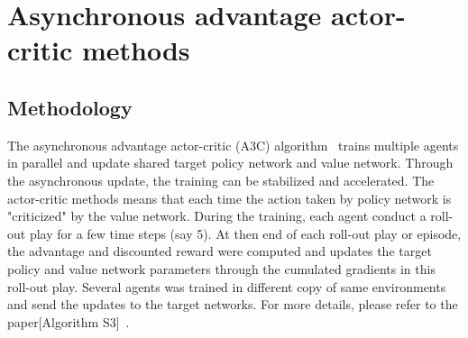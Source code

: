 
\section{Asynchronous advantage actor-critic methods}
\subsection{Methodology}

The asynchronous advantage actor-critic (A3C) algorithm~\cite{mnih2016asynchronous}
 trains multiple agents in parallel and update shared
target policy network and value network. 
Through the asynchronous update, the training can be stabilized 
and accelerated. The actor-critic methods means that each time
the action taken by policy network is "criticized"
by the value network. During the training, each agent conduct a 
roll-out play for a few time steps (say 5). At then end of each 
roll-out play or episode, the advantage and discounted reward were
computed and updates the target policy and value network parameters
through the cumulated gradients in this roll-out play. Several agents
was trained in different copy of same environments and send the updates
to the target networks. For more details, please refer to the paper[Algorithm S3]~\cite{mnih2016asynchronous}.





